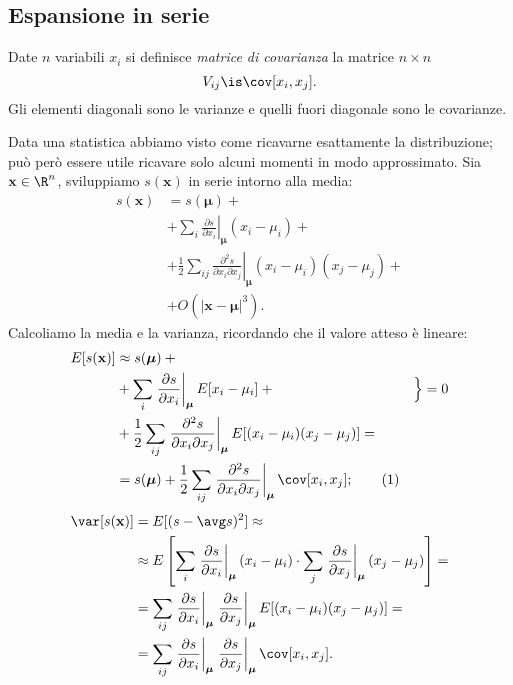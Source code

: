 
\subsection{Espansione in serie}

\begin{definition}
	Date $n$ variabili $x_i$ si definisce \emph{matrice di covarianza} la matrice $n\times n$
	\begin{equation*}
		V_{ij} \is \cov[x_i,x_j].
	\end{equation*}
	Gli elementi diagonali sono le varianze e quelli fuori diagonale sono le covarianze.
\end{definition}

Data una statistica abbiamo visto come ricavarne esattamente la distribuzione;
può però essere utile ricavare solo alcuni momenti in modo approssimato.
Sia $\mathbf x\in\R^n$, sviluppiamo $s(\mathbf x)$ in serie intorno alla media:
%
\begin{align*}
	s(\mathbf x) &= s(\boldsymbol \mu) + {}\\
	&+ \sum_i \left.\frac{\partial s}{\partial x_i}\right|_{\boldsymbol\mu} (x_i - \mu_i) + {}\\
	&+ \frac12 \sum_{ij} \left.\frac{\partial^2 s}{\partial x_i \partial x_j}\right|_{\boldsymbol\mu} (x_i-\mu_i)(x_j-\mu_j) + {}\\
	&+ O(|\mathbf x - \boldsymbol\mu|^3).
\end{align*}
Calcoliamo la media e la varianza, ricordando che il valore atteso è lineare:
\begin{align*}
	E[s(\mathbf x)] &\approx s(\boldsymbol \mu) + {}\\
	&+ \sum_i \left.\frac{\partial s}{\partial x_i}\right|_{\boldsymbol\mu} E[x_i - \mu_i] + {} & \Big\} = 0\\
	&+ \frac12 \sum_{ij} \left.\frac{\partial^2 s}{\partial x_i \partial x_j}\right|_{\boldsymbol\mu} E[(x_i-\mu_i)(x_j-\mu_j)] = \\
	&= s(\boldsymbol \mu) +
	\frac12 \sum_{ij} \left.\frac{\partial^2 s}{\partial x_i \partial x_j}\right|_{\boldsymbol\mu}
	\cov[x_i,x_j]; \refstepcounter{equation}\tag{\theequation}\label{eq:meantaylor}
\end{align*}
\begin{align*}
	\var[s(\mathbf x)] &= E[(s - \avg s)^2] \approx \\
	&\approx E\left[
	\sum_i \left.\frac{\partial s}{\partial x_i}\right|_{\boldsymbol\mu} (x_i - \mu_i) \cdot
	\sum_j \left.\frac{\partial s}{\partial x_j}\right|_{\boldsymbol\mu} (x_j - \mu_j) \right] = \\
	&= \sum_{ij}
	\left.\frac{\partial s}{\partial x_i}\right|_{\boldsymbol\mu}
	\left.\frac{\partial s}{\partial x_j}\right|_{\boldsymbol\mu}
	E[ (x_i - \mu_i) (x_j - \mu_j) ] = \\
	&= \sum_{ij}
	\left.\frac{\partial s}{\partial x_i}\right|_{\boldsymbol\mu}
	\left.\frac{\partial s}{\partial x_j}\right|_{\boldsymbol\mu}
	\cov[x_i,x_j].
\end{align*}
